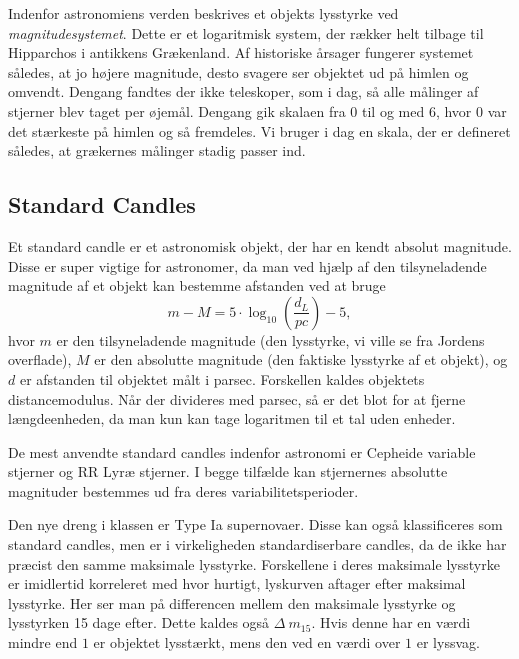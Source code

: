 Indenfor astronomiens verden beskrives et objekts lysstyrke ved \emph{magnitudesystemet}. Dette er et logaritmisk system, der rækker helt tilbage til Hipparchos i antikkens Grækenland. Af historiske årsager fungerer systemet således, at jo højere magnitude, desto svagere ser objektet ud på himlen og omvendt. Dengang fandtes der ikke teleskoper, som i dag, så alle målinger af stjerner blev taget per øjemål. Dengang gik skalaen fra 0 til og med 6, hvor 0 var det stærkeste på himlen og så fremdeles. Vi bruger i dag en skala, der er defineret således, at grækernes målinger stadig passer ind.

\subsection{Standard Candles}

Et standard candle er et astronomisk objekt, der har en kendt absolut magnitude. Disse er super vigtige for astronomer, da man ved hjælp af den tilsyneladende magnitude af et objekt kan bestemme afstanden ved at bruge
\begin{equation}
m-M=5\cdot \log_{10}(\frac{d_L}{pc}) - 5 ,
\end{equation}
hvor $m$ er den tilsyneladende magnitude (den lysstyrke, vi ville se fra Jordens overflade), $M$ er den absolutte magnitude (den faktiske lysstyrke af et objekt), og $d$ er afstanden til objektet målt i parsec. Forskellen kaldes objektets distancemodulus. Når der divideres med parsec, så er det blot for at fjerne længdeenheden, da man kun kan tage logaritmen til et tal uden enheder.

De mest anvendte standard candles indenfor astronomi er Cepheide variable stjerner og RR Lyræ stjerner. I begge tilfælde kan stjernernes absolutte magnituder bestemmes ud fra deres variabilitetsperioder.

Den nye dreng i klassen er Type Ia supernovaer. Disse kan også klassificeres som standard candles, men er i virkeligheden standardiserbare candles, da de ikke har præcist den samme maksimale lysstyrke. Forskellene i deres maksimale lysstyrke er imidlertid korreleret med hvor hurtigt, lyskurven aftager efter maksimal lysstyrke. Her ser man på differencen mellem den maksimale lysstyrke og lysstyrken 15 dage efter. Dette kaldes også $\Delta~m_{15}$. Hvis denne har en værdi mindre end $1$ er objektet lysstærkt, mens den ved en værdi over $1$ er lyssvag.
